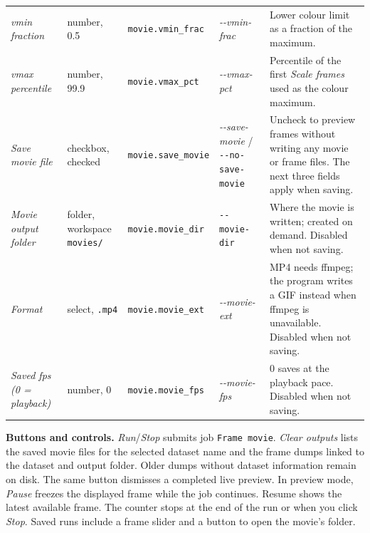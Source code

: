 \documentclass[11pt,a4paper]{article}
\newcommand{\code}[1]{\texttt{#1}}
\begin{document}
\begin{center}
\begin{longtable}{@{}L{3.4cm}L{2.3cm}L{2.5cm}L{2.8cm}L{4.9cm}@{}}
\addlinespace
\emph{vmin fraction} & number, 0.5 & \code{movie.\allowbreak{}vmin\_\allowbreak{}frac} &
\emph{-\allowbreak{}-\allowbreak{}vmin-\allowbreak{}frac} & Lower colour limit as a fraction of the maximum. \\
\addlinespace
\emph{vmax percentile} & number, 99.9 & \code{movie.\allowbreak{}vmax\_\allowbreak{}pct} &
\emph{-\allowbreak{}-\allowbreak{}vmax-\allowbreak{}pct} & Percentile of the first \emph{Scale frames} used as the
colour maximum. \\
\addlinespace
\emph{Save movie file} & checkbox, checked & \code{movie.\allowbreak{}save\_\allowbreak{}movie} &
\emph{-\allowbreak{}-\allowbreak{}save-\allowbreak{}movie} / \code{-\allowbreak{}-\allowbreak{}no-\allowbreak{}save-\allowbreak{}movie} & Uncheck to preview frames without
writing any movie or frame files. The next three fields apply when saving. \\
\addlinespace
\emph{Movie output folder} & folder, workspace \code{movies/\allowbreak{}} &
\code{movie.movie\_\allowbreak{}dir} & \code{-\allowbreak{}-\allowbreak{}movie-\allowbreak{}dir} & Where the movie is written;
created on demand. Disabled when not saving. \\
\addlinespace
\emph{Format} & select, \code{.\allowbreak{}mp4} & \code{movie.\allowbreak{}movie\_\allowbreak{}ext} &
\emph{-\allowbreak{}-\allowbreak{}movie-\allowbreak{}ext} & MP4 needs ffmpeg; the program writes a GIF instead when
ffmpeg is unavailable. Disabled when not saving. \\
\addlinespace
\emph{Saved fps (0 = playback)} & number, 0 & \code{movie.\allowbreak{}movie\_\allowbreak{}fps} &
\emph{-\allowbreak{}-\allowbreak{}movie-\allowbreak{}fps} & 0 saves at the playback pace. Disabled when not saving. \\
\end{longtable}
\end{center}

\textbf{Buttons and controls.} \emph{Run}/\emph{Stop} submits job
\code{Frame movie}. \emph{Clear outputs} lists the saved movie files for
the selected dataset name and the frame dumps linked to the dataset and output
folder. Older dumps without dataset information remain on disk. The same
button dismisses a completed live preview. In preview mode,
\emph{Pause} freezes the displayed frame while the job continues. Resume
shows the latest available frame. The counter stops at the end of the run
or when you click \emph{Stop}. Saved runs include a frame slider and a
button to open the movie's folder.
\end{document}
